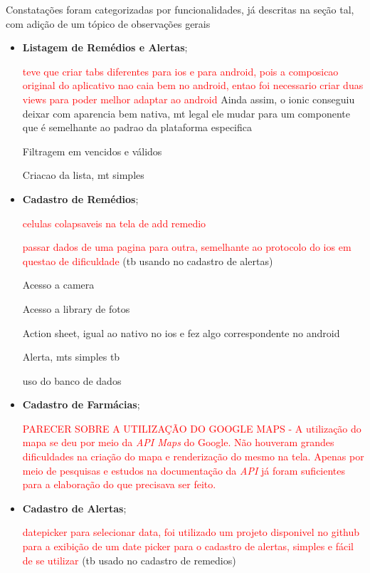Constatações foram categorizadas por funcionalidades, já descritas na seção tal, com adição de um tópico de observações gerais

 \begin{itemize}
 	
 	\item \textbf{Listagem de Remédios e Alertas};
 	 	
 	 	\textcolor{red}{teve que criar tabs diferentes para ios e para android, pois a composicao original do aplicativo nao caia bem no android, entao foi necessario criar duas views para poder melhor adaptar ao android}
 	 	Ainda assim, o ionic conseguiu deixar com aparencia bem nativa, mt legal ele mudar para um componente que é semelhante ao padrao da plataforma especifica
 	 	
 	 	Filtragem em vencidos e válidos
 	 	
 	 	Criacao da lista, mt simples
 	
 	
 	\item \textbf{Cadastro de Remédios};
 	
 	\textcolor{red}{celulas colapsaveis na tela de add remedio}
 	
 	 \textcolor{red}{passar dados de uma pagina para outra, semelhante ao protocolo do ios em questao de dificuldade} (tb usando no cadastro de alertas)
 	
 	Acesso a camera
 	
 	Acesso a library de fotos
 
	 Action sheet, igual ao nativo no ios e fez algo correspondente no android
	 
	 Alerta, mts simples tb
	 
	 uso do banco de dados
 	
 	\item \textbf{Cadastro de Farmácias};
 	
 	\textcolor{red}{PARECER SOBRE A UTILIZAÇÃO DO GOOGLE MAPS - A utilização do mapa se deu por meio da \textit{API Maps} do Google. Não houveram grandes dificuldades na criação do mapa e renderização do mesmo na tela. Apenas por meio de pesquisas e estudos na documentação
 		da \textit{API} já foram suficientes para a elaboração do que precisava ser feito. }
 	
 	
 	\item \textbf{Cadastro de Alertas};
 	
 	\textcolor{red}{datepicker para selecionar data, foi utilizado um projeto disponivel no github para a exibição de um date picker para o cadastro de alertas, simples e fácil de se utilizar} (tb usado no cadastro de remedios)
 	

\end{itemize}
